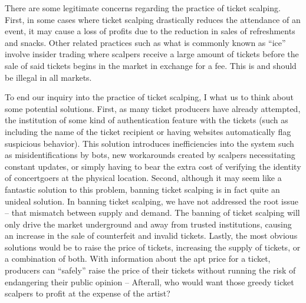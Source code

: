 There are some legitimate concerns regarding the practice of ticket scalping. First, in some cases where ticket scalping drastically reduces the attendance of an event, it may cause a loss of profits due to the reduction in sales of refreshments and snacks. Other related practices such as what is commonly known as “ice” involve insider trading where scalpers receive a large amount of tickets before the sale of said tickets begins in the market in exchange for a fee. This is and should be illegal in all markets.  

To end our inquiry into the practice of ticket scalping, I what us to think about some potential solutions. First, as many ticket producers have already attempted, the institution of some kind of authentication feature with the tickets (such as including the name of the ticket recipient or having websites automatically flag suspicious behavior). This solution introduces inefficiencies into the system such as misidentifications by bots, new workarounds created by scalpers necessitating constant updates, or simply having to bear the extra cost of verifying the identity of concertgoers at the physical location. Second, although it may seem like a fantastic solution to this problem, banning ticket scalping is in fact quite an unideal solution. In banning ticket scalping, we have not addressed the root issue – that mismatch between supply and demand. The banning of ticket scalping will only drive the market underground and away from trusted institutions, causing an increase in the sale of counterfeit and invalid tickets. Lastly, the most obvious solutions would be to raise the price of tickets, increasing the supply of tickets, or a combination of both. With information about the apt price for a ticket, producers can “safely” raise the price of their tickets without running the risk of endangering their public opinion – Afterall, who would want those greedy ticket scalpers to profit at the expense of the artist?  
